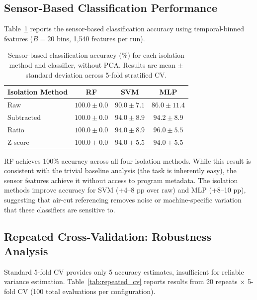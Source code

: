 \subsection{Sensor-Based Classification Performance}

Table~\ref{tab:main_results} reports the sensor-based classification accuracy using temporal-binned features ($B = 20$ bins, 1{,}540 features per run).

\begin{table}[H]
\caption{Sensor-based classification accuracy (\%) for each isolation method and classifier, without PCA. Results are mean $\pm$ standard deviation across 5-fold stratified CV.}\label{tab:main_results}
\centering
\begin{tabular}{lccc}
\toprule
\textbf{Isolation Method} & \textbf{RF} & \textbf{SVM} & \textbf{MLP} \\
\midrule
Raw          & $100.0 \pm 0.0$ & $90.0 \pm 7.1$ & $86.0 \pm 11.4$ \\
Subtracted   & $100.0 \pm 0.0$ & $94.0 \pm 8.9$ & $94.2 \pm 8.9$ \\
Ratio        & $100.0 \pm 0.0$ & $94.0 \pm 8.9$ & $96.0 \pm 5.5$ \\
Z-score      & $100.0 \pm 0.0$ & $94.0 \pm 5.5$ & $94.0 \pm 5.5$ \\
\bottomrule
\end{tabular}
\end{table}

RF achieves 100\% accuracy across all four isolation methods. While this result is consistent with the trivial baseline analysis (the task is inherently easy), the sensor features achieve it without access to program metadata. The isolation methods improve accuracy for SVM (+4--8 pp over raw) and MLP (+8--10 pp), suggesting that air-cut referencing removes noise or machine-specific variation that these classifiers are sensitive to.

\subsection{Repeated Cross-Validation: Robustness Analysis}

Standard 5-fold CV provides only 5 accuracy estimates, insufficient for reliable variance estimation. Table~\ref{tab:repeated_cv} reports results from 20 repeats $\times$ 5-fold CV (100 total evaluations per configuration).

